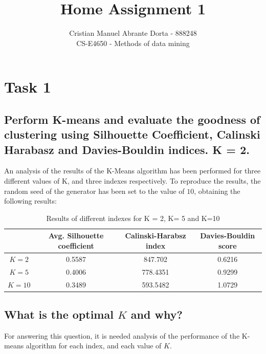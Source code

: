 \documentclass[12pt]{article}
\begin{document}
 
\title{Home Assignment 1}
\author{Cristian Manuel Abrante Dorta - 888248\\
CS-E4650 - Methods of data mining}

\maketitle
\section{Task 1}
\label{sec:task-1}

\subsection{Perform K-means and evaluate the goodness of clustering using
Silhouette Coefficient, Calinski Harabasz and Davies-Bouldin indices.
K = 2.}

An analysis of the results of the K-Means algorithm has been performed for three different values of K, and three indexes respectively. To reproduce the results, the random seed of the generator has been set to the value of $10$, obtaining the following results:

\begin{table}[h]
\centering
\begin{tabular}{c|ccc}
       & Avg. Silhouette coefficient & Calinski-Harabsz index & Davies-Bouldin score \\ \hline
$K = 2$  & 0.5587                 & 847.702                & 0.6216               \\
$K = 5$  & 0.4006                 & 778.4351               & 0.9299               \\
$K = 10$ & 0.3489                 & 593.5482               & 1.0729              \\

\end{tabular}
\caption{Results of different indexes for K = 2, K= 5 and K=10}
\label{tab:coefs}
\end{table}

\subsection{What is the optimal $K$ and why?}
\label{sec:optimal-k}

For answering this question, it is needed analysis of the performance of the K-means algorithm for each index, and each value of $K$.
\end{document}
